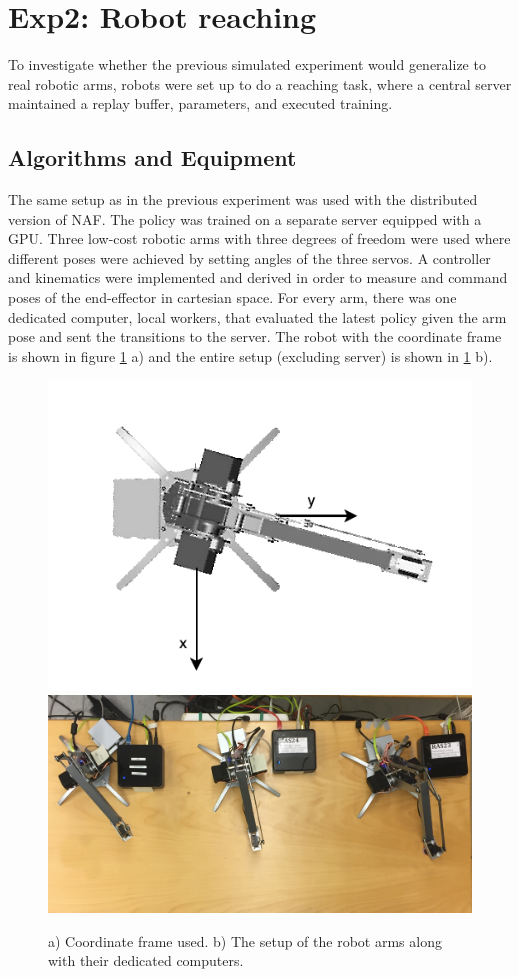 \section{Exp2: Robot reaching}

To investigate whether the previous simulated experiment would generalize to
real robotic arms, robots were set up to do a reaching task, where a central
server maintained a replay buffer, parameters, and executed training.

\subsection{Algorithms and Equipment}

The same setup as in the previous experiment was used with the distributed
version of NAF. The policy was trained on a separate server equipped with a
GPU. Three low-cost robotic arms with three degrees of freedom were used where
different poses were achieved by setting angles of the three servos. A
controller and kinematics were implemented and derived in order to measure and
command poses of the end-effector in cartesian space. For every arm, there was
one dedicated computer, local workers, that evaluated the latest policy given
the arm pose and sent the transitions to the server. The robot with the
coordinate frame is shown in figure \ref{fig:uarm_coordinate_frame} a) and the
entire setup (excluding server) is shown in \ref{fig:uarm_coordinate_frame} b).

\begin{figure}[ht]
    \centering
    \includegraphics[width=0.39 \textwidth]{res/uarm_coordinates.pdf}
    \includegraphics[width=0.59 \textwidth]{res/uarm_moving_setup.png}

    \caption{a) Coordinate frame used. b) The setup of the robot arms along
    with their dedicated computers.}

    \label{fig:uarm_coordinate_frame}
    
\end{figure}

